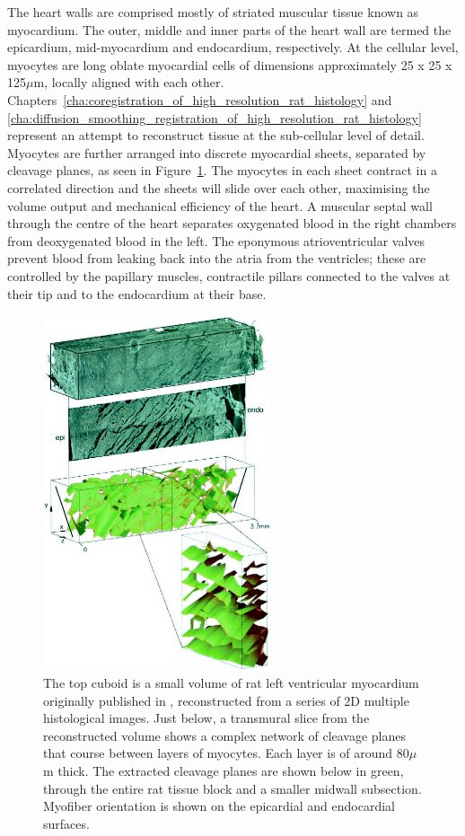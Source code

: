 The heart walls are comprised mostly of striated muscular tissue known as myocardium. The outer, middle and inner parts of the heart wall are termed the epicardium, mid-myocardium and endocardium, respectively. At the cellular level, myocytes are long oblate myocardial cells of dimensions approximately 25 x 25 x 125$\mu$m, locally aligned with each other. Chapters~\ref{cha:coregistration_of_high_resolution_rat_histology} and \ref{cha:diffusion_smoothing_registration_of_high_resolution_rat_histology} represent an attempt to reconstruct tissue at the sub-cellular level of detail. Myocytes are further arranged into discrete myocardial sheets, separated by cleavage planes, as seen in Figure~\ref{fig:sheets}. The myocytes in each sheet contract in a correlated direction and the sheets will slide over each other, maximising the volume output and mechanical efficiency of the heart. A muscular septal wall through the centre of the heart separates oxygenated blood in the right chambers from deoxygenated blood in the left. The eponymous atrioventricular valves prevent blood from leaking back into the atria from the ventricles; these are controlled by the papillary muscles, contractile pillars connected to the valves at their tip and to the endocardium at their base.

  \begin{figure}[htbp]
    \centering
    \includegraphics[width=0.6\textwidth]{Ch2/Figs/sheets}
    \caption{The top cuboid is a small volume of rat left ventricular myocardium originally published in \cite{Hooks2002}, reconstructed from a series of 2D multiple histological images. Just below, a transmural slice from the reconstructed volume shows a complex network of cleavage planes that course between layers of myocytes. Each layer is of around 80$\mu$m thick. The extracted cleavage planes are shown below in green, through the entire rat tissue block and a smaller midwall subsection. Myofiber orientation is shown on the epicardial and endocardial surfaces.}
    \label{fig:sheets}
  \end{figure}

